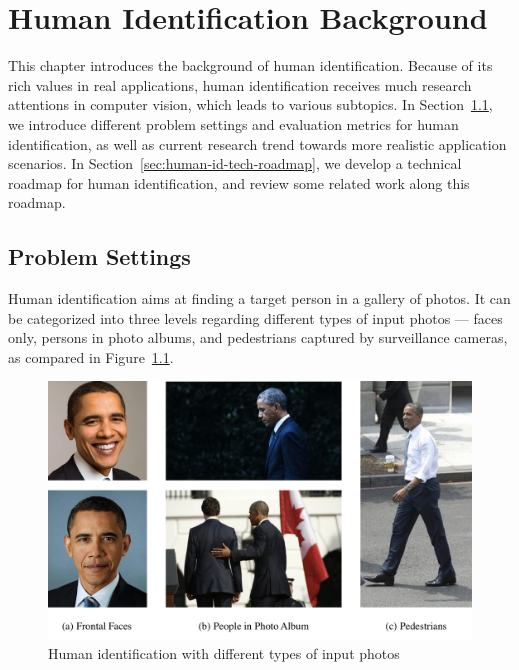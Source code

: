 \chapter{Human Identification Background}
\label{ch:human-identification-background}



This chapter introduces the background of human identification. Because of its rich values in real applications, human identification receives much research attentions in computer vision, which leads to various subtopics. In Section~\ref{sec:human-id-prob-settings}, we introduce different problem settings and evaluation metrics for human identification, as well as current research trend towards more realistic application scenarios. In Section~\ref{sec:human-id-tech-roadmap}, we develop a technical roadmap for human identification, and review some related work along this roadmap.

\section{Problem Settings} %
\label{sec:human-id-prob-settings}
Human identification aims at finding a target person in a gallery of photos. It can be categorized into three levels regarding different types of input photos --- faces only, persons in photo albums, and pedestrians captured by surveillance cameras, as compared in Figure~\ref{fig:human-id-problems}.
\begin{figure}[t]
\begin{center}
\includegraphics[width=1.0\linewidth]{figures/human-id.pdf}
\caption{Human identification with different types of input photos}
\label{fig:human-id-problems}
\end{center}
\end{figure}

